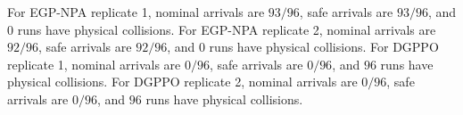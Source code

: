 For EGP-NPA replicate 1, nominal arrivals are $93/96$, safe arrivals are $93/96$, and $0$ runs have physical collisions.
For EGP-NPA replicate 2, nominal arrivals are $92/96$, safe arrivals are $92/96$, and $0$ runs have physical collisions.
For DGPPO replicate 1, nominal arrivals are $0/96$, safe arrivals are $0/96$, and $96$ runs have physical collisions.
For DGPPO replicate 2, nominal arrivals are $0/96$, safe arrivals are $0/96$, and $96$ runs have physical collisions.
